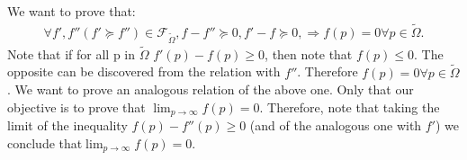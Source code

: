 \documentclass[
course = {{C*-Algebra}},
quartile = {{1}},
assignment = 1,
name = {{Samir Salmen}},
studentnumber = {{NUSP: 11298636}},
email = {{samir.salmen@usp.br}},
firstexercise = 1
]{aga-homework}
\begin{document}
\exercise
	\subexercise
	We want to prove that:
	\begin{align*}
		\forall f', f'' (f' \succeq f'') \in  \mathcal{F}_{\tilde{\Omega}}, f-f'' \succeq 0, f'-f \succeq 0,
		\Longrightarrow f(p) = 0 \forall p \in \tilde{\Omega}
	.\end{align*}	
	Note that if for all p in $\tilde{\Omega}$ $f'(p)-f(p) \geq 0$, then note that $f(p) \leq 0$. The opposite can be discovered from the relation with $f''$. Therefore $f(p) = 0 \forall p \in  \tilde{\Omega}$.
	\subexercise
		We want to prove an analogous relation of the above one. Only that our objective is to prove that
		$\lim_{p\longrightarrow \infty} f(p) = 0$. Therefore, note that taking  the limit of the inequality $f(p) -
		f''(p) \geq 0$ (and of the analogous one with $f'$) we conclude that$\lim_{p\longrightarrow \infty} f(p) = 0$.

\exercise
		
\end{document}
